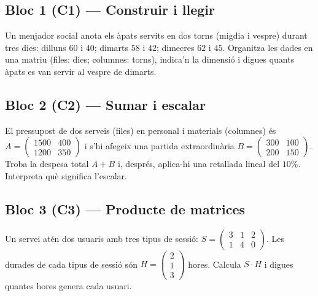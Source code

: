 \subsection{Bloc 1 (C1) — Construir i llegir}

\begin{exercicis}[Bloc 1]
\begin{exlist}
  \item Un menjador social anota els àpats servits en dos torns (migdia i vespre)
        durant tres dies: dilluns $60$ i $40$; dimarts $58$ i $42$; dimecres $62$ i
        $45$. Organitza les dades en una matriu (files: dies; columnes: torns),
        indica'n la dimensió i digues quants àpats es van servir al vespre de
        dimarts.
\end{exlist}
\end{exercicis}

\subsection{Bloc 2 (C2) — Sumar i escalar}

\begin{exercicis}[Bloc 2]
\begin{exlist}
  \item El pressupost de dos serveis (files) en personal i materials (columnes) és
        $A=\begin{pmatrix} 1500 & 400 \\ 1200 & 350 \end{pmatrix}$ i s'hi afegeix una
        partida extraordinària $B=\begin{pmatrix} 300 & 100 \\ 200 & 150 \end{pmatrix}$.
        Troba la despesa total $A+B$ i, després, aplica-hi una retallada lineal del
        $10\%$. Interpreta què significa l'escalar.
\end{exlist}
\end{exercicis}

\subsection{Bloc 3 (C3) — Producte de matrices}

\begin{exercicis}[Bloc 3]
\begin{exlist}
  \item Un servei atén dos usuaris amb tres tipus de sessió:
        $S=\begin{pmatrix} 3 & 1 & 2 \\ 1 & 4 & 0 \end{pmatrix}$. Les durades de cada
        tipus de sessió són $H=\begin{pmatrix} 2 \\ 1 \\ 3 \end{pmatrix}$ hores.
        Calcula $S\cdot H$ i digues quantes hores genera cada usuari.
\end{exlist}
\end{exercicis}

